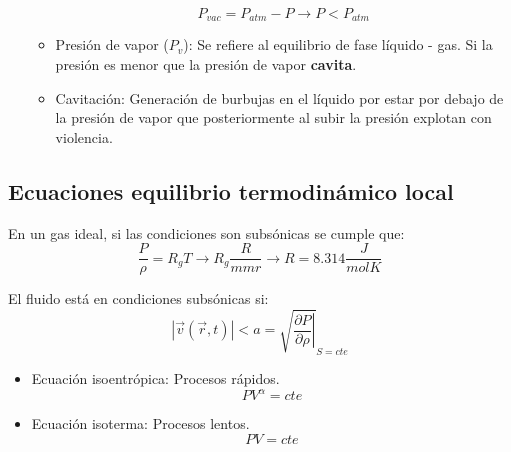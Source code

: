 \begin{enumerate}
\begin{itemize}
		\[P_{vac}= P_{atm}-P \rightarrow P<P_{atm}\]
		
		\item Presión de vapor ($P_v$): Se refiere al equilibrio de fase líquido - gas. Si la presión es menor que la presión de vapor \textbf{cavita}.
		\item Cavitación: Generación de burbujas en el líquido por estar por debajo de la presión de vapor que posteriormente al subir la presión explotan con violencia. 
	\end{itemize}
	
\end{enumerate}

\subsection{Ecuaciones equilibrio termodinámico local}
En un gas ideal, si las condiciones son subsónicas se cumple que:
\[\frac{P}{\rho}=R_gT \rightarrow R_g\frac{R}{mmr} \rightarrow R ={8.314} \frac{J}{mol K}\]

El fluido está en condiciones subsónicas si:
\[\left| \vec{v}(\vec{r},t) \right|<a=\sqrt {\left. \frac{\partial P}{\partial \rho} \right|}_{S=cte}\]

\begin{itemize}
	\item Ecuación isoentrópica: Procesos rápidos.
	\[PV^\alpha=cte\]
	\item Ecuación isoterma: Procesos lentos.
	\[PV=cte\]
\end{itemize}
